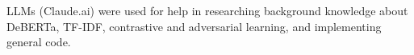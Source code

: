 \documentclass[manuscript,nonacm]{acmart}
\begin{document}
\begin{acks}
LLMs (Claude.ai) were used for help in researching background knowledge about
DeBERTa, TF-IDF, contrastive and adversarial learning, and implementing general
code.
\end{acks}

\nocite{vaswani2017,wiki_fakereview,wiki_llm}


\end{document}
